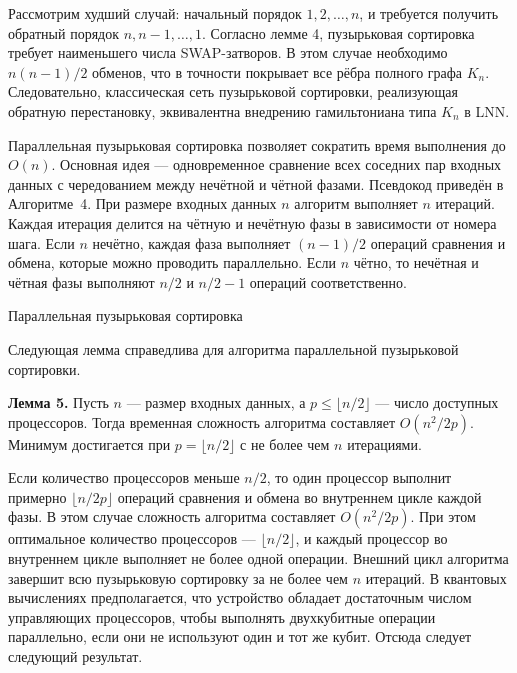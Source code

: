 Рассмотрим худший случай: начальный порядок $1, 2, \dots, n$, и требуется
получить обратный порядок $n, n-1, \dots, 1$. Согласно лемме 4, пузырьковая
сортировка требует наименьшего числа SWAP-затворов. В этом случае необходимо
$n(n-1)/2$ обменов, что в точности покрывает все рёбра полного графа $K_n$.
Следовательно, классическая сеть пузырьковой сортировки, реализующая обратную
перестановку, эквивалентна внедрению гамильтониана типа $K_n$ в LNN.

Параллельная пузырьковая сортировка позволяет сократить время выполнения до
$O(n)$. Основная идея — одновременное сравнение всех соседних пар входных
данных с чередованием между нечётной и чётной фазами. Псевдокод приведён в
Алгоритме~4. При размере входных данных $n$ алгоритм выполняет $n$ итераций.
Каждая итерация делится на чётную и нечётную фазы в зависимости от номера шага.
Если $n$ нечётно, каждая фаза выполняет $(n - 1)/2$ операций сравнения и
обмена, которые можно проводить параллельно. Если $n$ чётно, то нечётная и
чётная фазы выполняют $n/2$ и $n/2 - 1$ операций соответственно.

\begin{algorithm}[htp!]
    \SetAlgoLined



    \caption{Параллельная пузырьковая сортировка}
    \label{alg:parallelBubble}
\end{algorithm}

Следующая лемма справедлива для алгоритма параллельной пузырьковой сортировки.

\textbf{Лемма 5.} Пусть $n$ — размер входных данных, а $p \leq \lfloor n/2
\rfloor$ — число доступных процессоров. Тогда временная сложность алгоритма
составляет $O(n^2 / 2p)$. Минимум достигается при $p = \lfloor n/2 \rfloor$ с
не более чем $n$ итерациями.

Если количество процессоров меньше $n/2$, то один процессор выполнит примерно
$\lfloor n / 2p \rfloor$ операций сравнения и обмена во внутреннем цикле каждой
фазы. В этом случае сложность алгоритма составляет $O(n^2 / 2p)$. При этом
оптимальное количество процессоров — $\lfloor n/2 \rfloor$, и каждый процессор
во внутреннем цикле выполняет не более одной операции. Внешний цикл алгоритма
завершит всю пузырьковую сортировку за не более чем $n$ итераций. В квантовых
вычислениях предполагается, что устройство обладает достаточным числом
управляющих процессоров, чтобы выполнять двухкубитные операции параллельно,
если они не используют один и тот же кубит. Отсюда следует следующий результат.


